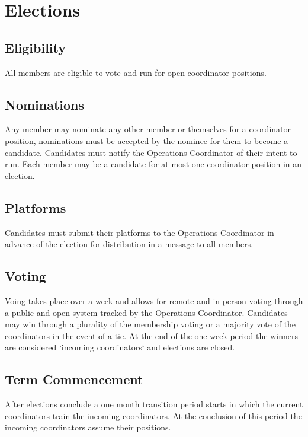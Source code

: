 \chapter{Elections}\label{sec:elections}

\section{Eligibility}\label{sec:eligibility}
All members are eligible to vote and run for open coordinator positions.

\section{Nominations}\label{sec:nominations}
Any member may nominate any other member or themselves for a coordinator position, nominations must be accepted by the nominee for them to become a candidate. Candidates must notify the Operations Coordinator of their intent to run. Each member may be a candidate for at most one coordinator position in an election.

\section{Platforms}\label{sec:platforms}
Candidates must submit their platforms to the Operations Coordinator in advance of the election for distribution in a message to all members.

\section{Voting}\label{sec:voting}
Voing takes place over a week and allows for remote and in person voting through a public and open system tracked by the Operations Coordinator. Candidates may win through a plurality of the membership voting or a majority vote of the coordinators in the event of a tie. At the end of the one week period the winners are considered `incoming coordinators` and elections are closed.

\section{Term Commencement}\label{sec:term_commencement}
After elections conclude a one month transition period starts in which the current coordinators train the incoming coordinators. At the conclusion of this period the incoming coordinators assume their positions.

